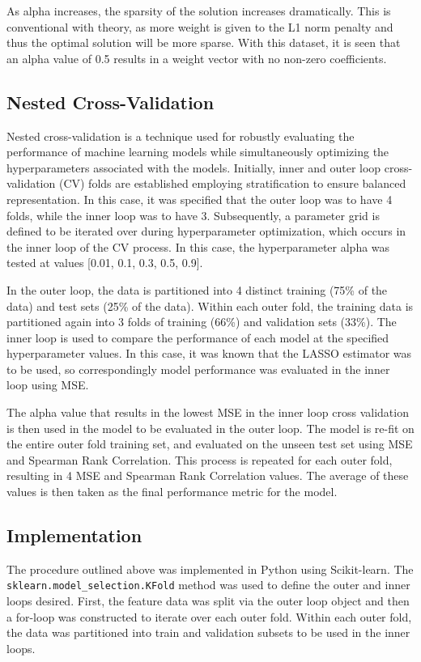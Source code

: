 \documentclass[11pt]{article}
\begin{document}
\vspace{-0.5cm}

As alpha increases, the sparsity of the solution increases dramatically. This is conventional with theory, as more weight is given to the L1 norm penalty and thus the optimal solution will be more sparse. With this dataset, it is seen that an alpha value of 0.5 results in a weight vector with no non-zero coefficients. 

\subsection{Nested Cross-Validation}
Nested cross-validation is a technique used for robustly evaluating the performance of machine learning models while simultaneously optimizing the hyperparameters associated with the models. Initially, inner and outer loop cross-validation (CV) folds are established employing stratification to ensure balanced representation. In this case, it was specified that the outer loop was to have 4 folds, while the inner loop was to have 3. Subsequently, a parameter grid is defined to be iterated over during hyperparameter optimization, which occurs in the inner loop of the CV process. In this case, the hyperparameter alpha was tested at values [0.01, 0.1, 0.3, 0.5, 0.9].

In the outer loop, the data is partitioned into 4 distinct training (75\% of the data) and test sets (25\% of the data). Within each outer fold, the training data is partitioned again into 3 folds of training (66\%) and validation sets (33\%). The inner loop is used to compare the performance of each model at the specified hyperparameter values. In this case, it was known that the LASSO estimator was to be used, so correspondingly model performance was evaluated in the inner loop using MSE. 

The alpha value that results in the lowest MSE in the inner loop cross validation is then used in the model to be evaluated in the outer loop. The model is re-fit on the entire outer fold training set, and evaluated on the unseen test set using MSE and Spearman Rank Correlation. This process is repeated for each outer fold, resulting in 4 MSE and Spearman Rank Correlation values. The average of these values is then taken as the final performance metric for the model.

\subsection{Implementation}
The procedure outlined above was implemented in Python using Scikit-learn. The \\ \verb|sklearn.model_selection.KFold| method was used to define the outer and inner loops desired. First, the feature data was split via the outer loop object and then a for-loop was constructed to iterate over each outer fold. Within each outer fold, the data was partitioned into train and validation subsets to be used in the inner loops. 
\end{document}
